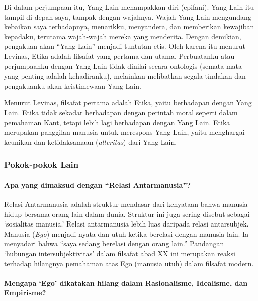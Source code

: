 \documentclass[10pt,a4paper]{article}
\begin{document}
\begin{multicols}{2}
Di dalam perjumpaan itu, Yang Lain menampakkan diri (epifani). Yang Lain
itu tampil di depan saya, tampak dengan wajahnya. Wajah Yang Lain
mengundang kebaikan saya terhadapnya, menarikku, menyandera, dan
memberikan kewajiban kepadaku, terutama wajah-wajah mereka yang
menderita. Dengan demikian, pengakuan akan ``Yang Lain'' menjadi
tuntutan etis. Oleh karena itu menurut Levinas, Etika adalah filsafat
yang pertama dan utama. Perbuatanku atau perjumpaanku dengan Yang Lain
tidak dinilai secara ontologis (semata-mata yang penting adalah
kehadiranku), melainkan melibatkan segala tindakan dan pengakuanku akan
keistimewaan Yang Lain.

Menurut Levinas, filsafat pertama adalah Etika, yaitu berhadapan dengan
Yang Lain. Etika tidak sekadar berhadapan dengan perintah moral seperti
dalam pemahaman Kant, tetapi lebih lagi berhadapan dengan Yang Lain.
Etika merupakan panggilan manusia untuk merespons Yang Lain, yaitu
menghargai keunikan dan ketidaksamaan (\emph{alteritas}) dari Yang Lain.

\hypertarget{pokok-pokok-lain}{%
\subsubsection{Pokok-pokok Lain}\label{pokok-pokok-lain}}

\hypertarget{apa-yang-dimaksud-dengan-relasi-antarmanusia}{%
\paragraph{Apa yang dimaksud dengan ``Relasi
Antarmanusia''?}\label{apa-yang-dimaksud-dengan-relasi-antarmanusia}}

Relasi Antarmanusia adalah struktur mendasar dari kenyataan bahwa
manusia hidup bersama orang lain dalam dunia. Struktur ini juga sering
disebut sebagai `sosialitas manusia.' Relasi antarmanusia lebih luas
daripada relasi antarsubjek. Manusia (\emph{Ego}) menjadi nyata dan utuh
ketika berelasi dengan manusia lain. Ia menyadari bahwa ``saya sedang
berelasi dengan orang lain.'' Pandangan `hubungan intersubjektivitas'
dalam filsafat abad XX ini merupakan reaksi terhadap hilangnya pemahaman
atas Ego (manusia utuh) dalam filsafat modern.

\hypertarget{mengapa-ego-dikatakan-hilang-dalam-rasionalisme-idealisme-dan-empirisme}{%
\paragraph{Mengapa `Ego' dikatakan hilang dalam Rasionalisme, Idealisme,
dan
Empirisme?}\label{mengapa-ego-dikatakan-hilang-dalam-rasionalisme-idealisme-dan-empirisme}}


\end{multicols}
\end{document}
